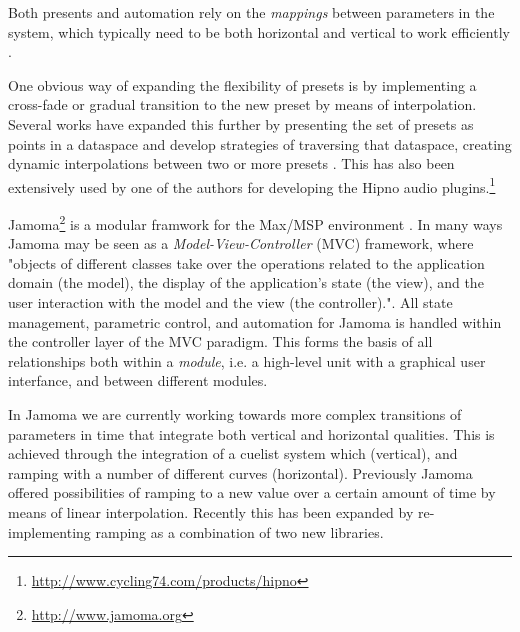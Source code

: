 \documentclass{article}
\begin{document}
Both presents and automation rely on the \emph{mappings} between parameters in the system, which typically need to be both horizontal and vertical to work efficiently \cite{Hunt:2003,Nort:2006}.

One obvious way of expanding the flexibility of presets is by implementing a cross-fade or gradual transition to the new preset by means of interpolation. Several works have expanded this further by presenting the set of presets as points in a dataspace and develop strategies of traversing that dataspace, creating dynamic interpolations between two or more presets \cite{Dahlstedt:2001,Momeni:2003, Bencina:2005metasurface}. This has also been extensively used by one of the authors for developing the Hipno audio plugins.\footnote{\url{http://www.cycling74.com/products/hipno}}


Jamoma\footnote{\url{http://www.jamoma.org}} is a modular framwork for the Max/MSP environment \cite{Place:2006}. In many ways Jamoma may be seen as a \emph{Model-View-Controller} (MVC) framework, where "objects of different classes take over the operations related to the application domain (the model), the display of the application's state (the view), and the user interaction with the model and the view (the controller)."\cite[p26]{Krasner:1988}. All state management, parametric control, and automation for Jamoma is handled within the controller layer of the MVC paradigm. This forms the basis of all relationships both within a \emph{module}, i.e. a high-level unit with a graphical user interfance, and between different modules.

In Jamoma we are currently working towards more complex transitions of parameters in time that integrate both vertical and horizontal qualities. This is achieved through the integration of a cuelist system which (vertical), and ramping with a number of different curves (horizontal). Previously Jamoma offered possibilities of ramping to a new value over a certain amount of time by means of linear interpolation. Recently this has been expanded by re-implementing ramping as a combination of two new libraries. 

\end{document}
